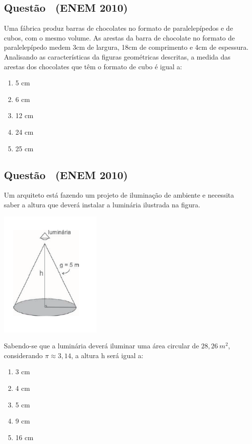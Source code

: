 \documentclass[12pt]{article}
\newcounter{questao}
\newcommand{\novaquestao}[1]{%
  \stepcounter{questao}%
  \subsection*{Questão \thequestao\ (#1)}%
}
\begin{document}
\begin{multicols}{2}
        \novaquestao{ENEM 2010}
            Uma fábrica produz barras de chocolates no formato de paralelepípedos e de cubos, com o mesmo volume. As arestas da barra de chocolate no formato de paralelepípedo medem 3cm de largura, 18cm de comprimento e 4cm de espessura. Analisando as características da figuras geométricas descritas, a medida das arestas dos chocolates que têm o formato de cubo é igual a:
            
            \begin{enumerate}[label=(\alph*), noitemsep]
                \item 5  cm
                \item {6  cm} %
                \item 12  cm
                \item 24  cm
                \item 25  cm 
            \end{enumerate}

        \novaquestao{ENEM 2010}
            Um arquiteto está fazendo um projeto de iluminação de ambiente e necessita saber a altura que deverá instalar a luminária ilustrada na figura.

            \begin{center}
                \includegraphics[scale=0.6]{imagem/q30.png}
            \end{center} Sabendo-se que a luminária deverá iluminar uma área circular de $28,26\ m^{2}$, considerando $\pi \approx 3,14$, a altura h será igual a:
        
            \begin{enumerate}[label=(\alph*), noitemsep]
                \item 3 cm
                \item {4 cm} %
                \item 5 cm
                \item 9 cm
                \item 16 cm 
            \end{enumerate}


\end{multicols}
\end{document}
